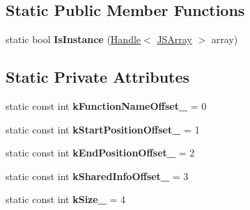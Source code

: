 \subsection*{Static Public Member Functions}
\begin{DoxyCompactItemize}
\item 
static bool {\bfseries Is\+Instance} (\hyperlink{classv8_1_1internal_1_1_handle}{Handle}$<$ \hyperlink{classv8_1_1internal_1_1_j_s_array}{J\+S\+Array} $>$ array)\hypertarget{classv8_1_1internal_1_1_shared_info_wrapper_a1c08fcb40e25b98fe0ca70ee17e7a5a6}{}\label{classv8_1_1internal_1_1_shared_info_wrapper_a1c08fcb40e25b98fe0ca70ee17e7a5a6}

\end{DoxyCompactItemize}
\subsection*{Static Private Attributes}
\begin{DoxyCompactItemize}
\item 
static const int {\bfseries k\+Function\+Name\+Offset\+\_\+} = 0\hypertarget{classv8_1_1internal_1_1_shared_info_wrapper_a4b6ddd3ad4ccb81ec8791c6a1e22e08e}{}\label{classv8_1_1internal_1_1_shared_info_wrapper_a4b6ddd3ad4ccb81ec8791c6a1e22e08e}

\item 
static const int {\bfseries k\+Start\+Position\+Offset\+\_\+} = 1\hypertarget{classv8_1_1internal_1_1_shared_info_wrapper_a9c531962ff94b71013fb7212e6a35f21}{}\label{classv8_1_1internal_1_1_shared_info_wrapper_a9c531962ff94b71013fb7212e6a35f21}

\item 
static const int {\bfseries k\+End\+Position\+Offset\+\_\+} = 2\hypertarget{classv8_1_1internal_1_1_shared_info_wrapper_a4541bdb5b6e1c99c831e2881fdee4270}{}\label{classv8_1_1internal_1_1_shared_info_wrapper_a4541bdb5b6e1c99c831e2881fdee4270}

\item 
static const int {\bfseries k\+Shared\+Info\+Offset\+\_\+} = 3\hypertarget{classv8_1_1internal_1_1_shared_info_wrapper_a6742fd2fca7cc6ff7aee3c9ec7e09912}{}\label{classv8_1_1internal_1_1_shared_info_wrapper_a6742fd2fca7cc6ff7aee3c9ec7e09912}

\item 
static const int {\bfseries k\+Size\+\_\+} = 4\hypertarget{classv8_1_1internal_1_1_shared_info_wrapper_aadeca0733e6a68c86ba7ba49d0a41a8c}{}\label{classv8_1_1internal_1_1_shared_info_wrapper_aadeca0733e6a68c86ba7ba49d0a41a8c}

\end{DoxyCompactItemize}
